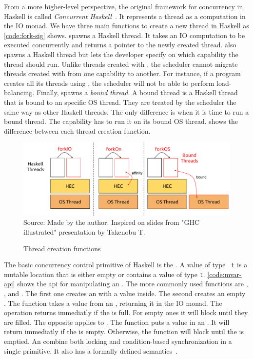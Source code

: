 From a more higher-level perspective, the original framework for concurrency in Haskell is called \emph{Concurrent Haskell}~\cite{smpj:1996}. It represents a thread as a computation in the IO monad. We have three main functions to create a new thread in Haskell as \autoref{code:fork-sig} shows. \forkIO spawns a Haskell thread. It takes an IO computation to be executed concurrently and returns a pointer to the newly created thread. \forkOn also spawns a Haskell thread but lets the developer specify on which capability the thread should run. Unlike threads created with \forkIO, the scheduler cannot migrate threads created with \forkOn from one capability to another. For instance, if a program creates all its threads using \forkOn, the scheduler will not be able to perform load-balancing. Finally, \forkOS spawns a \emph{bound thread}. A bound thread is a Haskell thread that is bound to an specific OS thread. They are treated by the scheduler the same way as other Haskell threads. The only difference is when it is time to run a bound thread. The capability has to run it on its bound OS thread.  shows the difference between each thread creation function.

\begin{figure}[htp]
  \centering
  \caption{Thread creation functions}
  \includegraphics[width=\columnwidth]{images/haskell-threads}
  \footnotesize{Source: Made by the author. Inspired on slides from "GHC illustrated" presentation by Takenobu T.}
  \label{fig:haskell-threads}
\end{figure}

The basic concurrency control primitive of Haskell is the \MVar. A value of type \MVar~\texttt{t} is a mutable location that is either empty or contains a value of type \texttt{t}. \autoref{code:mvar-api} shows the \ac{api} for manipulating an \MVar. The more commonly used functions are \newMVar, \newEmptyMVar, \takeMVar and \putMVar. The first one creates an \MVar with a value inside. The second creates an empty \MVar. The \takeMVar function takes a value from an \MVar, returning it in the IO monad. The operation returns immediatly if the \MVar is full. For empty ones it will block until they are filled. The opposite applies to \putMVar. The function puts a value in an \MVar. It will return immediatly if the \MVar is empty. Otherwise, the function will block until the \MVar is emptied. An \MVar combine both locking and condition-based synchronization in a single primitive. It also has a formally defined semantics~\cite{smpj:1996}.

